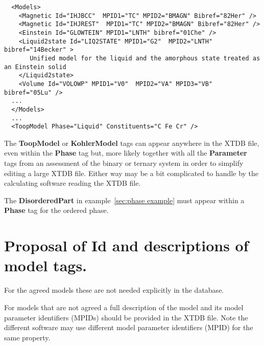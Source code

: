 \documentclass{article}
\begin{document}
\begin{appendices}
{\small
\begin{verbatim}
  <Models>
    <Magnetic Id="IHJBCC"  MPID1="TC" MPID2="BMAGN" Bibref="82Her" />
    <Magnetic Id="IHJREST"  MPID1="TC" MPID2="BMAGN" Bibref="82Her" />
    <Einstein Id="GLOWTEIN" MPID1="LNTH" bibref="01Che" /> 
    <Liquid2state Id="LIQ2STATE" MPID1="G2"  MPID2="LNTH" bibref="14Becker" >
       Unified model for the liquid and the amorphous state treated as an Einstein solid
    </Liquid2state>
    <Volume Id="VOLOWP" MPID1="V0"  MPID2="VA" MPID3="VB" bibref="05Lu" />
  ...
  </Models>
  ...
  <ToopModel Phase="Liquid" Constituents="C Fe Cr" />
\end{verbatim}
}

The {\bf ToopModel} or {\bf KohlerModel} tags can appear anywhere in
the XTDB file, even within the {\bf Phase} tag but, more likely
together with all the {\bf Parameter} tags from an assessment of the
binary or ternary system in order to simplify editing a large XTDB
file.  Either way may be a bit complicated to handle by the
calculating software reading the XTDB file.

The {\bf DisorderedPart} in example~\ref{sec:phase example} must appear
within a {\bf Phase} tag for the ordered phase.

\newpage 

\setcounter{equation}{0}
\renewcommand{\theequation}{B\arabic{equation}}
\setcounter{figure}{0}
\renewcommand{\thefigure}{B\arabic{figure}}

\section{Proposal of Id and descriptions of model tags.}\label{sec:modelapp}

For the agreed models these are not needed explicitly in the database.

For models that are not agreed a full description of the model and its
model parameter identifiers (MPIDs) should be provided in the XTDB
file.  Note the different software may use different model parameter
identifiers (MPID) for the same property.


\end{appendices}
\end{document}
